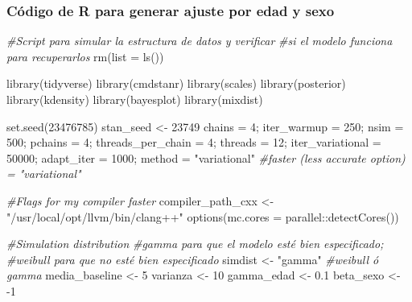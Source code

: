 \documentclass[
]{article}
\newenvironment{Shaded}{\begin{snugshade}}{\end{snugshade}}
\newcommand{\AttributeTok}[1]{\textcolor[rgb]{0.77,0.63,0.00}{#1}}
\newcommand{\CommentTok}[1]{\textcolor[rgb]{0.56,0.35,0.01}{\textit{#1}}}
\newcommand{\DecValTok}[1]{\textcolor[rgb]{0.00,0.00,0.81}{#1}}
\newcommand{\FloatTok}[1]{\textcolor[rgb]{0.00,0.00,0.81}{#1}}
\newcommand{\FunctionTok}[1]{\textcolor[rgb]{0.00,0.00,0.00}{#1}}
\newcommand{\NormalTok}[1]{#1}
\newcommand{\OtherTok}[1]{\textcolor[rgb]{0.56,0.35,0.01}{#1}}
\newcommand{\SpecialCharTok}[1]{\textcolor[rgb]{0.00,0.00,0.00}{#1}}
\newcommand{\StringTok}[1]{\textcolor[rgb]{0.31,0.60,0.02}{#1}}
\begin{document}
\hypertarget{cuxf3digo-de-r-para-generar-ajuste-por-edad-y-sexo}{%
\subsubsection{Código de R para generar ajuste por edad y
sexo}\label{cuxf3digo-de-r-para-generar-ajuste-por-edad-y-sexo}}

\begin{Shaded}
\begin{Highlighting}[]
\CommentTok{\#Script para simular la estructura de datos y verificar}
\CommentTok{\#si el modelo funciona para recuperarlos}
\FunctionTok{rm}\NormalTok{(}\AttributeTok{list =} \FunctionTok{ls}\NormalTok{())}

\FunctionTok{library}\NormalTok{(tidyverse)}
\FunctionTok{library}\NormalTok{(cmdstanr)}
\FunctionTok{library}\NormalTok{(scales)}
\FunctionTok{library}\NormalTok{(posterior)}
\FunctionTok{library}\NormalTok{(kdensity)}
\FunctionTok{library}\NormalTok{(bayesplot)}
\FunctionTok{library}\NormalTok{(mixdist)}

\FunctionTok{set.seed}\NormalTok{(}\DecValTok{23476785}\NormalTok{)}
\NormalTok{stan\_seed }\OtherTok{\textless{}{-}} \DecValTok{23749}
\NormalTok{chains }\OtherTok{=} \DecValTok{4}\NormalTok{; iter\_warmup }\OtherTok{=} \DecValTok{250}\NormalTok{; nsim }\OtherTok{=} \DecValTok{500}\NormalTok{; pchains }\OtherTok{=} \DecValTok{4}\NormalTok{; }
\NormalTok{threads\_per\_chain }\OtherTok{=} \DecValTok{4}\NormalTok{; threads }\OtherTok{=} \DecValTok{12}\NormalTok{; iter\_variational }\OtherTok{=} \DecValTok{50000}\NormalTok{;}
\NormalTok{adapt\_iter }\OtherTok{=} \DecValTok{1000}\NormalTok{;}
\NormalTok{method }\OtherTok{=} \StringTok{"variational"} \CommentTok{\#faster (less accurate option) = "variational"}

\CommentTok{\#Flags for my compiler faster}
\NormalTok{compiler\_path\_cxx }\OtherTok{\textless{}{-}} \StringTok{"/usr/local/opt/llvm/bin/clang++"}
\FunctionTok{options}\NormalTok{(}\AttributeTok{mc.cores =}\NormalTok{ parallel}\SpecialCharTok{::}\FunctionTok{detectCores}\NormalTok{())}

\CommentTok{\#Simulation distribution}
\CommentTok{\#gamma para que el modelo esté bien especificado;}
\CommentTok{\#weibull para que no esté bien especificado}
\NormalTok{simdist }\OtherTok{\textless{}{-}} \StringTok{"gamma"} \CommentTok{\#weibull ó gamma}
\NormalTok{media\_baseline }\OtherTok{\textless{}{-}} \DecValTok{5}
\NormalTok{varianza       }\OtherTok{\textless{}{-}} \DecValTok{10}
\NormalTok{gamma\_edad     }\OtherTok{\textless{}{-}} \FloatTok{0.1}
\NormalTok{beta\_sexo      }\OtherTok{\textless{}{-}} \SpecialCharTok{{-}}\DecValTok{1}


\end{Highlighting}
\end{Shaded}
\end{document}
